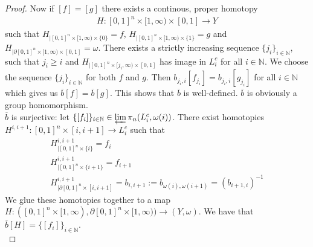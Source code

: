\documentclass[a4paper,11pt]{article}
\theoremstyle{definition}
\theoremstyle{plain}
\theoremstyle{remark}
\begin{document}
{\begin{proof}
Now if $[f]=[g]$ there exists a continous, proper homotopy  
\begin{align*}
H:[0,1]^n \times [1,\infty) \times [0,1] \rightarrow Y
\end{align*}
such that $H_{| [0,1]^n \times [1,\infty) \times \{0\}}=f$, $H_{| [0,1]^n \times [1,\infty) \times \{1\}} = g$ and $H_{|\partial [0,1]^n \times [1,\infty) \times [0,1]} = \omega$. There exists a strictly increasing sequence $\{j_i\}_{i\in \mathbb{N}}$, such that $j_i\geq i$ and $H_{|[0,1]^n \times [j_i,\infty) \times [0,1]}$ has image in $L^c_{i}$ for all $i\in \mathbb{N}$. We choose the sequence $\{j_i\}_{i\in \mathbb{N}}$ for both $f$ and $g$. Then $b_{j_i,i}[f_{j_i}] = b_{j_i,i} [g_{j_i}]$ for all $i\in \mathbb{N}$ which gives us $\overline{b}[f] = \overline{b}[g]$.  This shows that $\overline{b}$ is well-defined. $\overline{b}$ is obviously a group homomorphism. \\

$\overline{b}$ is surjective: let $\{[f_{i}]\}_{i\in \mathbb{N}} \in \varprojlim \pi_{n}(L^c_{i},\omega(i))$. There exist homotopies $H^{i,i+1}: [0,1]^n \times [i,i+1] \rightarrow L^c_{i}$ such that 
\begin{align*}
H^{i,i+1}_{|[0,1]^n \times \{i\}} = f_i\\
H^{i,i+1}_{|[0,1]^n \times \{i+1\}} = f_{i+1}\\
H^{i,i+1}_{|\partial[0,1]^n \times [i,i+1]} = b_{i,i+1}:=b_{\omega(i),\omega(i+1)}=(b_{i+1,i})^{-1}
\end{align*}
We glue these homotopies together to a map $H: ([0,1]^n \times [1,\infty), \partial [0,1]^n \times [1,\infty))\rightarrow (Y,\omega)$. We have that $\overline{b}[H] = \{[f_i]\}_{i\in \mathbb{N}}$. \\


\end{proof}}
\end{document}
